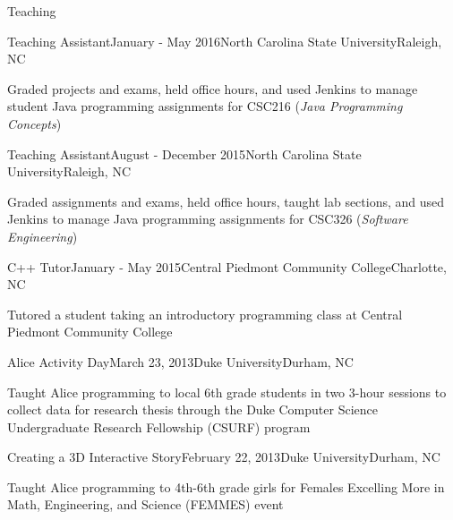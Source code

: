 \documentclass{resume} %
\begin{document}
\begin{rSection}{Teaching}
\begin{rSubsection}{Teaching Assistant}{January - May 2016}{North Carolina State University}{Raleigh, NC}
\item Graded projects and exams, held office hours, and used Jenkins to manage student Java programming assignments for CSC216 (\textit{Java Programming Concepts})
\end{rSubsection}
\vspace{-5pt}

\begin{rSubsection}{Teaching Assistant}{August - December 2015}{North Carolina State University}{Raleigh, NC}
\item Graded assignments and exams, held office hours, taught lab sections, and used Jenkins to manage Java programming assignments for CSC326 (\textit{Software Engineering})
\end{rSubsection}
\vspace{-5pt}

\begin{rSubsection}{C++ Tutor}{January - May 2015}{Central Piedmont Community College}{Charlotte, NC}
\item Tutored a student taking an introductory programming class at Central Piedmont Community College
\end{rSubsection}
\vspace{-5pt}

\begin{rSubsection}{Alice Activity Day}{March 23, 2013}{Duke University}{Durham, NC}
\item Taught Alice programming to local 6th grade students in two 3-hour sessions to collect data for research thesis through the Duke Computer Science Undergraduate Research Fellowship (CSURF) program
\end{rSubsection}
\vspace{-5pt}


\begin{rSubsection}{Creating a 3D Interactive Story}{February 22, 2013}{Duke University}{Durham, NC}
\item Taught Alice programming to 4th-6th grade girls for Females Excelling More in Math, Engineering, and Science (FEMMES) event
\end{rSubsection}
\vspace{-5pt}


\end{rSection}
\end{document}
